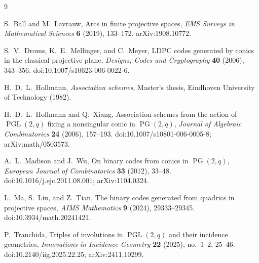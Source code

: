 \documentclass[11pt]{article}
\theoremstyle{definition}
\theoremstyle{remark}
\newcommand{\PG}{\operatorname{PG}}
\newcommand{\PGL}{\operatorname{PGL}}
\begin{document}
\begin{thebibliography}{9}

S.~Ball and M.~Lavrauw,
\newblock Arcs in finite projective spaces,
\newblock \emph{EMS Surveys in Mathematical Sciences} \textbf{6} (2019),
133--172.
\newblock arXiv:1908.10772.

S.~V.~Droms, K.~E.~Mellinger, and C.~Meyer,
\newblock LDPC codes generated by conics in the classical projective plane,
\newblock \emph{Designs, Codes and Cryptography} \textbf{40} (2006),
343--356.
\newblock doi:10.1007/s10623-006-0022-6.

H.~D.~L.~Hollmann,
\newblock \emph{Association schemes},
\newblock Master's thesis, Eindhoven University of Technology (1982).

H.~D.~L.~Hollmann and Q.~Xiang,
\newblock Association schemes from the action of
\(\PGL(2,q)\) fixing a nonsingular conic in \(\PG(2,q)\),
\newblock \emph{Journal of Algebraic Combinatorics} \textbf{24} (2006),
157--193.
\newblock doi:10.1007/s10801-006-0005-8; arXiv:math/0503573.

A.~L.~Madison and J.~Wu,
\newblock On binary codes from conics in \(\PG(2,q)\),
\newblock \emph{European Journal of Combinatorics} \textbf{33} (2012),
33--48.
\newblock doi:10.1016/j.ejc.2011.08.001; arXiv:1104.0324.

L.~Ma, S.~Liu, and Z.~Tian,
\newblock The binary codes generated from quadrics in projective spaces,
\newblock \emph{AIMS Mathematics} \textbf{9} (2024), 29333--29345.
\newblock doi:10.3934/math.20241421.

P.~Tranchida,
\newblock Triples of involutions in \(\PGL(2,q)\) and their incidence
geometries,
\newblock \emph{Innovations in Incidence Geometry} \textbf{22} (2025),
no.~1--2, 25--46.
\newblock doi:10.2140/iig.2025.22.25; arXiv:2411.10299.

\end{thebibliography}
\end{document}
